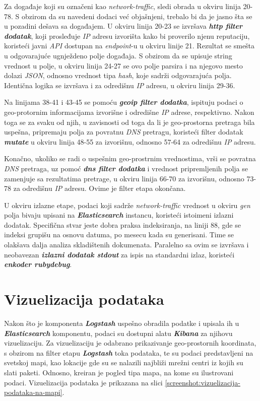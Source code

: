 \par
Za događaje koji su označeni kao \textit{network-traffic}, sledi obrada u okviru linija 20-78. S obzirom da su navedeni dodaci već objašnjeni, trebalo bi da je jasno šta se u pozadini dešava sa događajem. U okviru linija 20-23 se izvršava \textit{\textbf{http filter dodatak}}, koji prosleđuje \textit{IP} adresu izvorišta kako bi proverilo njenu reputaciju, koristeći javni \textit{API} dostupan na \textit{endpoint}-u u okviru linije 21. Rezultat se smešta u odgovarajuće ugnježdeno polje događaja. S obzirom da se upisuje string vrednost u polje, u okviru linija 24-27 se ovo polje parsira i na njegovo mesto dolazi \textit{JSON}, odnosno vrednost tipa \textit{hash}, koje sadrži odgovarajuća polja. Identična logika se izvršava i za odredišnu \textit{IP} adresu, u okviru linija 29-36.

\par
Na linijama 38-41 i 43-45 se pomoću \textit{\textbf{geoip filter dodatka}}, ispituju podaci o geo-protornim informacijama izvorišne i odredišne \textit{IP} adrese, respektivno. Nakon toga se za svaku od njih, u zavisnosti od toga da li je geo-prostorna pretraga bila uspešna, pripremaju polja za povratnu \textit{DNS} pretragu, koristeći filter dodatak \textit{\textbf{mutate}} u okviru linija 48-55 za izvorišnu, odnosno 57-64 za odredišnu \textit{IP} adresu.

\par
Konačno, ukoliko se radi o uspešnim geo-prostrnim vrednostima, vrši se povratna \textit{DNS} pretraga, uz pomoć \textit{\textbf{dns filter dodatka}} i vrednost pripremljenih polja se zamenjuje sa rezultatima pretrage, u okviru linija 66-70 za izvorišnu, odnosno 73-78 za odredišnu \textit{IP} adresu. Ovime je filter etapa okončana.

\par
U okviru izlazne etape, podaci koji sadrže \textit{network-traffic} vrednost u okviru \textit{gen} polja bivaju upisani na \textit{\textbf{Elasticsearch}} instancu, koristeći istoimeni izlazni dodatak. Specifična stvar jeste dobra praksa indeksiranja, na liniji 88, gde se indeksi grupišu na osnovu datuma, po mesecu kada su generisani. Time se olakšava dalja analiza skladištenih dokumenata. Paralelno sa ovim se izvršava i neobavezan \textit{\textbf{izlazni dodatak stdout}} za ispis na standardni izlaz, koristeći \textit{\textbf{enkoder rubydebug}}.

\section{Vizuelizacija podataka}
Nakon što je komponenta \textit{\textbf{Logstash}} uspešno obradila podatke i upisala ih u \textit{\textbf{Elasticsearch}} komponentu, podaci su dostupni alatu \textit{\textbf{Kibana}} za njihovu vizuelizaciju. Za vizuelizaciju je odabrano prikazivanje geo-prostornih koordinata, s obzirom na filter etapu \textit{\textbf{Logstash}} toka podataka, te su podaci predstavljeni na svetskoj mapi, kao lokacije gde su se nalazili najbliži mrežni centri iz kojih su slati paketi. Odnosno, kreiran je pogled tipa mapa, na kome su ilustrovani podaci. Vizuelizacija podataka je prikazana na slici \ref{screenshot:vizuelizacija-podataka-na-mapi}.

